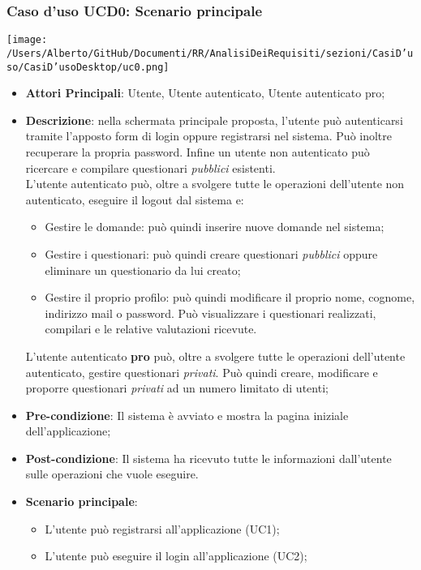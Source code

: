 

\subsubsection{Caso d'uso UCD0: Scenario principale}
\begin{center}
\texttt{[image: /Users/Alberto/GitHub/Documenti/RR/AnalisiDeiRequisiti/sezioni/CasiD'uso/CasiD'usoDesktop/uc0.png]}
\end{center}
\begin{itemize}
\item\textbf{Attori Principali}: Utente, Utente autenticato, Utente autenticato pro;
\item\textbf{Descrizione}: nella schermata principale proposta, l'utente può autenticarsi tramite l'apposto form di login oppure registrarsi nel sistema. Può inoltre recuperare la propria password. Infine un utente non autenticato può ricercare e compilare questionari \textit{pubblici} esistenti.\\
L'utente autenticato può, oltre a svolgere tutte le operazioni dell'utente non autenticato, eseguire il logout dal sistema e:
\begin{itemize}
\item Gestire le domande: può quindi inserire nuove domande nel sistema;
\item Gestire i questionari: può quindi creare questionari \textit{pubblici} oppure eliminare un questionario da lui creato;
\item Gestire il proprio profilo: può quindi modificare il proprio nome, cognome, indirizzo mail o password. Può visualizzare i questionari realizzati, compilari e le relative valutazioni ricevute.
\end{itemize}
L'utente autenticato \textbf{pro} può, oltre a svolgere tutte le operazioni dell'utente autenticato, gestire questionari \textit{privati}. Può quindi creare, modificare e proporre questionari \textit{privati} ad un numero limitato di utenti;
\item\textbf{Pre-condizione}: Il sistema è avviato e mostra la pagina iniziale dell'applicazione;
\item\textbf{Post-condizione}: Il sistema ha ricevuto tutte le informazioni dall'utente sulle operazioni che vuole eseguire.
\item\textbf{Scenario principale}:
\begin{itemize}
\item L'utente può registrarsi all'applicazione (UC1);
\item L'utente può eseguire il login all'applicazione (UC2);

\end{itemize}
\end{itemize}
